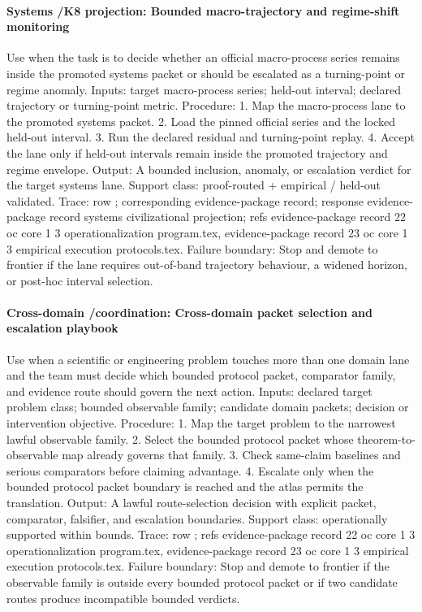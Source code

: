 \paragraph{Systems /\allowbreak K8 projection: Bounded macro-trajectory and regime-shift monitoring}
Use when the task is to decide whether an official macro-process series remains inside the promoted systems packet or should be escalated as a turning-point or regime anomaly.
Inputs: target macro-process series; \allowbreak held-out interval; \allowbreak declared trajectory or turning-point metric.
Procedure: 1. Map the macro-process lane to the promoted systems packet. 2. Load the pinned official series and the locked held-out interval. 3. Run the declared residual and turning-point replay. 4. Accept the lane only if held-out intervals remain inside the promoted trajectory and regime envelope.
Output: A bounded inclusion, anomaly, or escalation verdict for the target systems lane.
Support class: proof-routed + empirical / held-out validated.
Trace: row ; corresponding evidence-package record; \allowbreak response evidence-package record systems civilizational projection; \allowbreak refs evidence-package record 22 oc core 1 3 operationalization program.tex, \allowbreak evidence-package record 23 oc core 1 3 empirical execution protocols.tex.
Failure boundary: Stop and demote to frontier if the lane requires out-of-band trajectory behaviour, a widened horizon, or post-hoc interval selection.

\paragraph{Cross-domain /\allowbreak coordination: Cross-domain packet selection and escalation playbook}
Use when a scientific or engineering problem touches more than one domain lane and the team must decide which bounded protocol packet, comparator family, and evidence route should govern the next action.
Inputs: declared target problem class; \allowbreak bounded observable family; \allowbreak candidate domain packets; \allowbreak decision or intervention objective.
Procedure: 1. Map the target problem to the narrowest lawful observable family. 2. Select the bounded protocol packet whose theorem-to-observable map already governs that family. 3. Check same-claim baselines and serious comparators before claiming advantage. 4. Escalate only when the bounded protocol packet boundary is reached and the atlas permits the translation.
Output: A lawful route-selection decision with explicit packet, comparator, falsifier, and escalation boundaries.
Support class: operationally supported within bounds.
Trace: row ; \allowbreak refs evidence-package record 22 oc core 1 3 operationalization program.tex, \allowbreak evidence-package record 23 oc core 1 3 empirical execution protocols.tex.
Failure boundary: Stop and demote to frontier if the observable family is outside every bounded protocol packet or if two candidate routes produce incompatible bounded verdicts.


